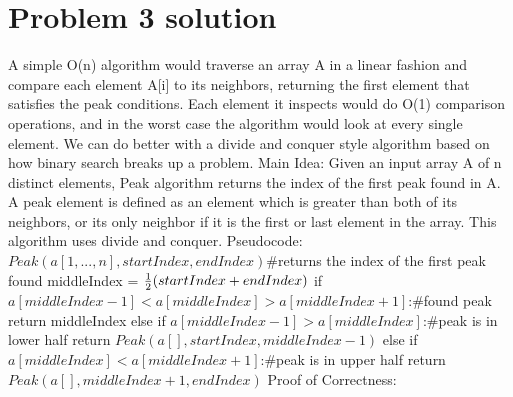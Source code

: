 \documentclass[11pt]{article}
\begin{document}
\section*{Problem 3 solution}
A simple O(n) algorithm would traverse an array A in a linear fashion and compare each element A[i] to its neighbors, returning the first element that satisfies the peak conditions. Each element it inspects would do O(1) comparison operations, and in the worst case the algorithm would look at every single element.
\newline
We can do better with a divide and conquer style algorithm based on how binary search breaks up a problem.
\newline
Main Idea:\newline
Given an input array A of n distinct elements, Peak algorithm returns the index of the first peak found in A. A peak element is defined as an element which is greater than both of its neighbors, or its only neighbor if it is the first or last element in the array. This algorithm uses divide and conquer.
\newline
\newline
Pseudocode:
\newline
$Peak(	a[1,...,n], startIndex, endIndex)$\indent\#returns the index of the first peak found\newline
\indent middleIndex = ${1 \over 2}(startIndex + endIndex)$\newline
\indent if $a[middleIndex-1]<a[middleIndex]>a[middleIndex+1]$:\indent \#found peak\newline
\indent \indent return middleIndex\newline
\indent else if $a[middleIndex-1]>a[middleIndex]$:\indent \#peak is in lower half\newline
\indent \indent return $Peak(a[],startIndex, middleIndex-1)$\newline
\indent else if $a[middleIndex]<a[middleIndex+1]$:\indent \#peak is in upper half\newline
\indent \indent return $Peak(a[],middleIndex+1,endIndex)$\newline
\newline
Proof of Correctness:\newline
\end{document}
